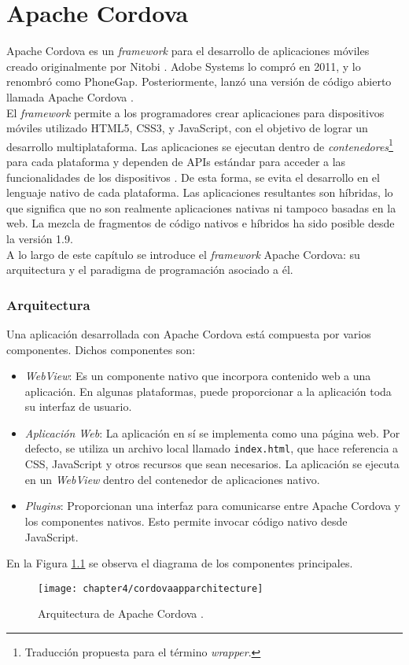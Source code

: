 \chapter{Apache Cordova}
Apache Cordova es un \emph{framework} para el desarrollo de aplicaciones móviles creado originalmente por Nitobi \cite{PBGP}. Adobe Systems lo compró en 2011, y lo renombró como PhoneGap. Posteriormente, lanzó una versión de código abierto llamada Apache Cordova \cite{ACO}.\\

El \emph{framework} permite a los programadores crear aplicaciones para dispositivos móviles utilizado HTML5, CSS3, y JavaScript, con el objetivo de lograr un desarrollo multiplataforma. Las aplicaciones se ejecutan dentro de \emph{contenedores}\footnote{Traducción propuesta para el término \emph{wrapper}.} para cada plataforma y dependen de APIs estándar para acceder a las funcionalidades de los dispositivos \cite{ACO}. De esta forma, se evita el desarrollo en el lenguaje nativo de cada plataforma. Las aplicaciones resultantes son híbridas, lo que significa que no son realmente aplicaciones nativas ni tampoco basadas en la web. La mezcla de fragmentos de código nativos e híbridos ha sido posible desde la versión 1.9.\\

A lo largo de este capítulo se introduce el \emph{framework} Apache Cordova: su arquitectura y el paradigma de programación asociado a él.
\subsection{Arquitectura}
Una aplicación desarrollada con Apache Cordova está compuesta por varios componentes. Dichos componentes son:
\begin{itemize}
    \item \emph{WebView}: Es un componente nativo que incorpora contenido web a una aplicación. En algunas plataformas, puede proporcionar a la aplicación toda su interfaz de usuario.
    \item \emph{Aplicación Web}: La aplicación en sí se implementa como una página web. Por defecto, se utiliza un archivo local llamado \texttt{index.html}, que hace referencia a CSS, JavaScript y otros recursos que sean necesarios. La aplicación se ejecuta en un \textit{WebView} dentro del contenedor de aplicaciones nativo.
    \item \emph{Plugins}: Proporcionan una interfaz para comunicarse entre Apache Cordova y los componentes nativos. Esto permite invocar código nativo desde JavaScript.
\end{itemize}
En la Figura \ref{fig:ch05:cordova-arch} se observa el diagrama de los componentes principales.
\begin{figure}[hbtp]
	\begin{center}
		\texttt{[image: chapter4/cordovaapparchitecture]}
	    \caption{Arquitectura de Apache Cordova \cite{ACO}.}
	    \label{fig:ch05:cordova-arch}
    \end{center}
\end{figure}
